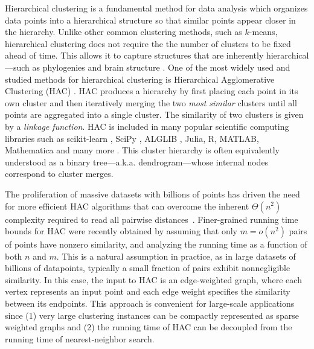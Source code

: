 \documentclass[11pt]{article}
\begin{document}
Hierarchical clustering is a fundamental method for data analysis which organizes data points into a hierarchical structure so that similar points appear closer in the hierarchy. Unlike other common clustering methods, such as $k$-means, hierarchical clustering does not require the the number of clusters to be fixed ahead of time. This allows it to capture structures that are inherently hierarchical---such as phylogenies \cite{eisen1998cluster} and brain structure \cite{boly2012hierarchical}. 
One of the most widely used and studied methods for hierarchical clustering is Hierarchical Agglomerative Clustering (HAC) \cite{king1967step,lance1967general,sneath1973principles}. HAC produces a hierarchy by first placing each point in its own cluster and then iteratively merging the two \emph{most similar} clusters until all points are aggregated into a single cluster. The similarity of two clusters is given by a \emph{linkage function}. HAC is included in many popular scientific computing libraries such as scikit-learn \cite{pedregosa2011scikit}, SciPy \cite{virtanen2020scipy}, ALGLIB \cite{shearer1985alglib}, Julia, R, MATLAB, Mathematica  and many more \cite{murtagh2012algorithms,murtagh2017algorithms}. This cluster hierarchy is often equivalently understood as a binary tree---a.k.a. dendrogram---whose internal nodes correspond to cluster merges.


The proliferation of massive datasets with billions of points has driven the need for more efficient HAC algorithms that can overcome the inherent $\Theta(n^2)$ complexity required to read all pairwise distances~\cite{dhulipala2023terahac, dhulipala2022hierarchical, monath2021scalable}. %
Finer-grained running time bounds for HAC were recently obtained by assuming that only $m = o(n^2)$ pairs of points have nonzero similarity, and analyzing the running time as a function of both $n$ and $m$.
This is a natural assumption in practice, as in large datasets of billions of datapoints, typically a small fraction of pairs exhibit nonnegligible similarity.
In this case, the input to HAC is an edge-weighted graph, where each vertex represents an input point and each edge weight specifies the similarity between its endpoints.
%
This approach is convenient for large-scale applications since (1) very large clustering instances can be compactly represented as sparse weighted graphs and (2) the running time of HAC can be decoupled from the running time of nearest-neighbor search.
%
\end{document}
